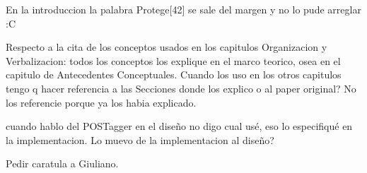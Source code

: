 En la introduccion la palabra Protege[42] se sale del margen y no lo pude arreglar :C

Respecto a la cita de los conceptos usados en los capitulos Organizacion y Verbalizacion: todos los conceptos los explique en el marco teorico, osea en el capitulo de Antecedentes Conceptuales. Cuando los uso en los otros capitulos tengo q hacer referencia a las Secciones donde los explico o al paper original? No los referencie porque ya los habia explicado.

cuando hablo del POSTagger en el diseño no digo cual usé, eso lo especifiqué en la implementacion. Lo muevo de la implementacion al diseño?

Pedir caratula a Giuliano.


